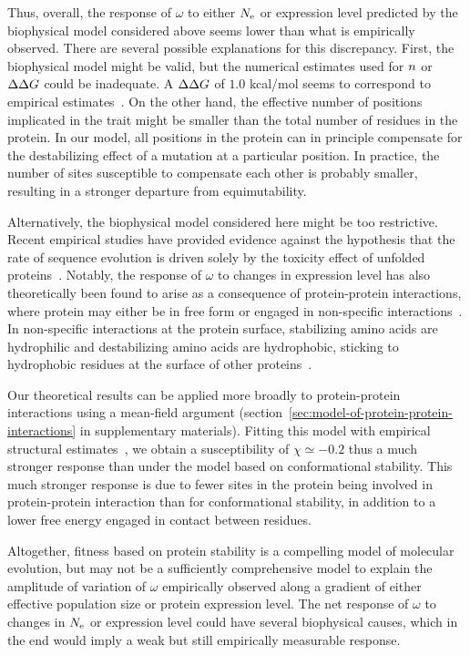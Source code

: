 Thus, overall, the response of $\omega$ to either $N_{\text{e}}$ or expression level predicted by the biophysical model considered above seems lower than what is empirically observed.
There are several possible explanations for this discrepancy.
First, the biophysical model might be valid, but the numerical estimates used for $n$ or $\Delta \Delta G$ could be inadequate.
A $\Delta \Delta G$ of $1.0$ kcal/mol seems to correspond to empirical estimates~\citep{Zeldovich2007}.
On the other hand, the effective number of positions implicated in the trait might be smaller than the total number of residues in the protein.
In our model, all positions in the protein can in principle compensate for the destabilizing effect of a mutation at a particular position.
In practice, the number of sites susceptible to compensate each other is probably smaller, resulting in a stronger departure from equimutability.

Alternatively, the biophysical model considered here might be too restrictive.
Recent empirical studies have provided evidence against the hypothesis that the rate of sequence evolution is driven solely by the toxicity effect of unfolded proteins~\citep{Plata2017,Razban2019,Biesiadecka2020}.
Notably, the response of $\omega$ to changes in expression level has also theoretically been found to arise as a consequence of protein-protein interactions, where protein may either be in free form or engaged in non-specific interactions~\citep{Yang2012, Zhang2013}.
In non-specific interactions at the protein surface, stabilizing amino acids are hydrophilic and destabilizing amino acids are hydrophobic, sticking to hydrophobic residues at the surface of other proteins~\citep{Dixit2013,Manhart2015}.

Our theoretical results can be applied more broadly to protein-protein interactions using a mean-field argument (section~\ref{sec:model-of-protein-protein-interactions} in supplementary materials).
Fitting this model with empirical structural estimates~\citep{Janin1995a, Zhang2008}, we obtain a susceptibility of $\chi \simeq -0.2$ thus a much stronger response than under the model based on conformational stability.
This much stronger response is due to fewer sites in the protein being involved in protein-protein interaction than for conformational stability, in addition to a lower free energy engaged in contact between residues.

Altogether, fitness based on protein stability is a compelling model of molecular evolution, but may not be a sufficiently comprehensive model to explain the amplitude of variation of $\omega$ empirically observed along a gradient of either effective population size or protein expression level.
The net response of $\omega$ to changes in $N_{\text{e}}$ or expression level could have several biophysical causes, which in the end would imply a weak but still empirically measurable response.

